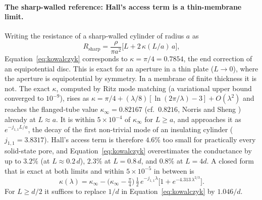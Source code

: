 \paragraph{The sharp-walled reference: Hall's access term is a thin-membrane limit.}
Writing the resistance of a sharp-walled cylinder of radius $a$ as
\begin{equation}
R_\mathrm{sharp} = \frac{\rho}{\pi a^{2}}\bigl[L + 2\,\kappa(L/a)\,a\bigr],
\label{eq:kappa}
\end{equation}
Equation~\eqref{eq:kowalczyk} corresponds to $\kappa = \pi/4 = 0.7854$, the end correction of an equipotential disc. This is exact for an aperture in a thin plate ($L \to 0$), where the aperture is equipotential by symmetry. In a membrane of finite thickness it is not. The exact $\kappa$, computed by Ritz mode matching (a variational upper bound converged to $10^{-9}$), rises as $\kappa = \pi/4 + (\lambda/8)[\ln(2\pi/\lambda) - 3] + O(\lambda^{2})$ and reaches the flanged-tube value $\kappa_\infty = 0.82167$ (cf.\ $0.8216$, Norris and Sheng ) already at $L \approx a$. It is within $5\times10^{-4}$ of $\kappa_\infty$ for $L \ge a$, and approaches it as $e^{-j_{1,1}L/a}$, the decay of the first non-trivial mode of an insulating cylinder ($j_{1,1} = 3.8317$). Hall's access term is therefore $4.6\%$ too small for practically every solid-state pore, and Equation~\eqref{eq:kowalczyk} overestimates the conductance by up to $3.2\%$ (at $L \approx 0.2\,d$), $2.3\%$ at $L = 0.8\,d$, and $0.8\%$ at $L = 4d$. A closed form that is exact at both limits and within $5\times10^{-5}$ in between is
\begin{equation}
\kappa(\lambda) = \kappa_\infty - \bigl(\kappa_\infty - \tfrac{\pi}{4}\bigr)\,\tfrac{1}{2}\,e^{-j_{1,1}\lambda}\bigl[1 + e^{-4.313\,\lambda^{2/3}}\bigr].
\end{equation}
For $L \ge d/2$ it suffices to replace $1/d$ in Equation~\eqref{eq:kowalczyk} by $1.046/d$.

